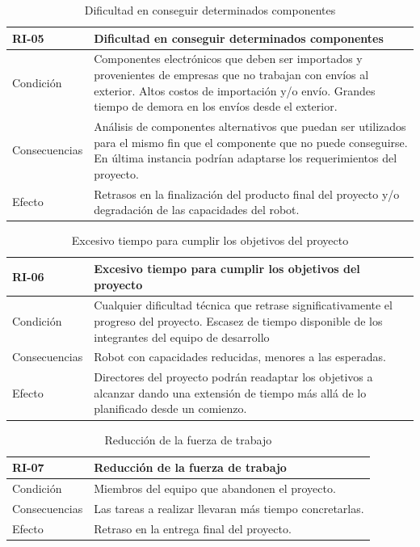 \begin{table}[H]
\centering
\begin{tabular} {|m{2.5cm}|m{11.5cm}|}
    \hline \rowcolor{test_header_color}
    RI-05 & Dificultad en conseguir determinados componentes \\
    \hline
        Condición & Componentes electrónicos que deben ser importados y provenientes de empresas que no trabajan con envíos al exterior. Altos costos de importación y/o envío. Grandes tiempo de demora en los envíos desde el exterior. \\
    \hline
        Consecuencias & Análisis de componentes alternativos que puedan ser utilizados para el mismo fin que el componente que no puede conseguirse. En última instancia podrían adaptarse los requerimientos del proyecto. \\
    \hline
        Efecto & Retrasos en la finalización del producto final del proyecto y/o degradación de las capacidades del robot. \\
    \hline
\end{tabular}
\caption{Dificultad en conseguir determinados componentes}
\end{table}

\begin{table}[H]
\centering
\begin{tabular} {|m{2.5cm}|m{11.5cm}|}
    \hline \rowcolor{test_header_color}
    RI-06 & Excesivo tiempo para cumplir los objetivos del proyecto \\
    \hline
        Condición & Cualquier dificultad técnica que retrase significativamente el progreso del proyecto. Escasez de tiempo disponible de los integrantes del equipo de desarrollo \\
    \hline
        Consecuencias & Robot con capacidades reducidas, menores a las esperadas. \\
    \hline
        Efecto & Directores del proyecto podrán readaptar los objetivos a alcanzar dando una extensión de tiempo más allá de lo planificado desde un comienzo. \\
    \hline
\end{tabular}
\caption{Excesivo tiempo para cumplir los objetivos del proyecto}
\end{table}

\begin{table}[H]
\centering
\begin{tabular} {|m{2.5cm}|m{11.5cm}|}
    \hline \rowcolor{test_header_color}
    RI-07 & Reducción de la fuerza de trabajo \\
    \hline
        Condición & Miembros del equipo que abandonen el proyecto. \\
    \hline
        Consecuencias & Las tareas a realizar llevaran más tiempo concretarlas. \\
    \hline
        Efecto & Retraso en la entrega final del proyecto. \\
    \hline
\end{tabular}
\caption{Reducción de la fuerza de trabajo}
\end{table}

